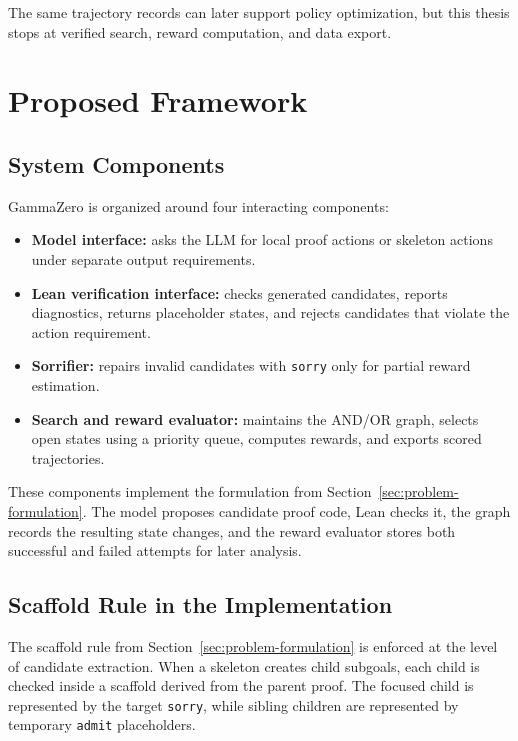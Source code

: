 \documentclass[en]{uet_awesome_thesis/uet-awesome-thesis}
\begin{document}
The same trajectory records can later support policy optimization, but this thesis stops at verified
search, reward computation, and data export.

\chapter{Proposed Framework}
\label{sec:framework}

\section{System Components}

GammaZero is organized around four interacting components:
\begin{itemize}
    \item \textbf{Model interface:} asks the LLM for local proof actions or skeleton actions under separate output requirements.
    \item \textbf{Lean verification interface:} checks generated candidates, reports diagnostics, returns placeholder states, and rejects candidates that violate the action requirement.
    \item \textbf{Sorrifier:} repairs invalid candidates with \texttt{sorry} only for partial reward estimation.
    \item \textbf{Search and reward evaluator:} maintains the AND/OR graph, selects open states using a priority queue, computes rewards, and exports scored trajectories.
\end{itemize}

These components implement the formulation from Section~\ref{sec:problem-formulation}. The model proposes candidate proof code, Lean checks it, the graph records the resulting state changes, and the reward evaluator stores both successful and failed attempts for later analysis.

\section{Scaffold Rule in the Implementation}

The scaffold rule from Section~\ref{sec:problem-formulation} is enforced at the level of candidate extraction. When a skeleton creates child subgoals, each child is checked inside a scaffold derived from the parent proof. The focused child is represented by the target \texttt{sorry}, while sibling children are represented by temporary \texttt{admit} placeholders.
\end{document}
